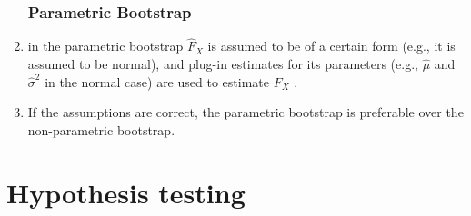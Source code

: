 \begin{enumerate}
\subsubsection{Parametric Bootstrap}

    \item in the parametric bootstrap $\hat{F}_X$ is assumed to be of a certain form (e.g., it is assumed to be normal), and plug-in estimates for its parameters (e.g., $\hat{\mu}$ and $\hat{\sigma}^2$ in the normal case) are used to estimate $F_X$ .
    \hfill \cite{statistics/book/Statistics-for-Data-Scientists/Maurits-Kaptein}

    \item If the assumptions are correct, the parametric bootstrap is preferable over the non-parametric bootstrap.
    \hfill \cite{statistics/book/Statistics-for-Data-Scientists/Maurits-Kaptein}

\end{enumerate}






\section{Hypothesis testing}

